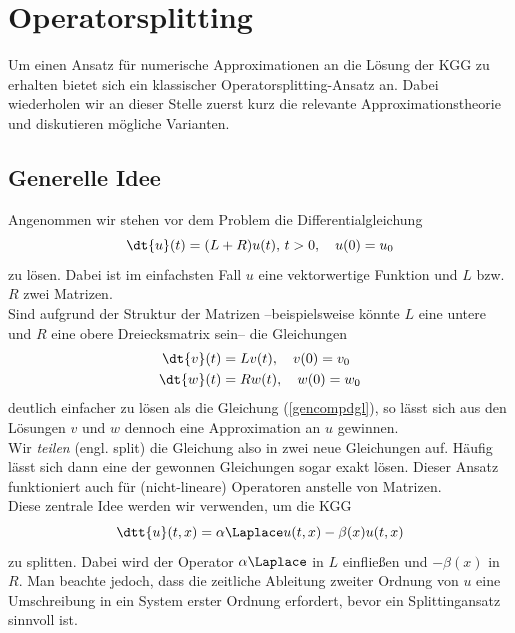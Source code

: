 \section{Operatorsplitting}
Um einen Ansatz für numerische Approximationen an die Lösung der KGG zu erhalten bietet sich ein klassischer Operatorsplitting-Ansatz an. Dabei wiederholen wir an dieser Stelle zuerst kurz die relevante Approximationstheorie und diskutieren mögliche Varianten.
\subsection{Generelle Idee}
Angenommen wir stehen vor dem Problem die Differentialgleichung 
\begin{equation}
\label{gencompdgl}
\dt{u}(t)=(L+R)u(t), \, t>0, \quad u(0)=u_0
\end{equation}
zu lösen. Dabei ist im einfachsten Fall $u$ eine vektorwertige Funktion und $L$ bzw. $R$ zwei Matrizen.\\
Sind aufgrund der Struktur der Matrizen --beispielsweise könnte $L$ eine untere und $R$ eine obere Dreiecksmatrix sein-- die Gleichungen 
\begin{align*}
\dt{v}(t)&=Lv(t), \quad v(0)=v_0\\
\dt{w}(t)&=Rw(t), \quad w(0)=w_0
\end{align*}
deutlich einfacher zu lösen als die Gleichung (\ref{gencompdgl}), so lässt sich aus den Lösungen $v$ und $w$ dennoch eine Approximation an $u$ gewinnen.\\
Wir \emph{teilen} (engl. split) die Gleichung also in zwei neue Gleichungen auf. Häufig lässt sich dann eine der gewonnen Gleichungen sogar exakt lösen. Dieser Ansatz funktioniert auch für (nicht-lineare) Operatoren anstelle von Matrizen.\\
Diese zentrale Idee werden wir verwenden, um die KGG 
\begin{equation*}
\dtt{u}(t,x)=\alpha\Laplace u(t,x)-\beta(x)u(t,x)
\end{equation*}
zu splitten. Dabei wird der Operator $\alpha\Laplace$ in $L$ einfließen und $-\beta(x)$ in $R$. Man beachte jedoch, dass die zeitliche Ableitung zweiter Ordnung von $u$ eine Umschreibung in ein System erster Ordnung erfordert, bevor ein Splittingansatz sinnvoll ist.

